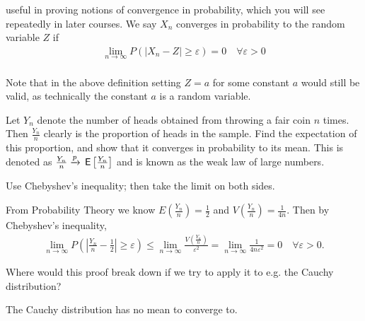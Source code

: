  useful in proving notions of convergence in probability, which you will see repeatedly in later courses.
We say $X_n$ converges in probability to the random variable $Z$ if
\begin{align*}
    \lim_{n\rightarrow\infty}P(\left|X_n-Z\right| \geq \varepsilon) = 0\quad\forall\varepsilon>0
\end{align*}\\
Note that in the above definition setting $Z=a$ for some constant $a$ would still be valid, as technically the constant $a$ is a random variable.

\begin{exercise}
Let $Y_n$ denote the number of heads obtained from throwing a fair coin $n$ times. Then $\frac{Y_n}{n}$ clearly is the proportion of heads in the sample. Find the expectation of this proportion, and show that it converges in probability to its mean. This is denoted as $\frac{Y_n}{n}\xrightarrow{p}\,\mathsf{E}\left[\frac{Y_n}{n}\right]$ and is known as the weak law of large numbers.\\
\begin{hint}
Use Chebyshev's inequality;  then take the limit on both sides.
\end{hint}
\begin{solution}
From Probability Theory we know $E\left(\frac{Y_n}{n}\right)=\frac12$ and $V\left(\frac{Y_n}{n}\right) = \frac{1}{4 n}$. Then by Chebyshev's inequality,
\begin{align*}
    \lim_{n\rightarrow\infty}P\left(\left|\frac{Y_n}{n}-\frac12\right| \geq \varepsilon\right) \leq  \lim_{n\rightarrow\infty}\frac{V\left(\frac{Y_n}{n}\right)}{\varepsilon^2} =  \lim_{n\rightarrow\infty}\frac{1}{4n\varepsilon^2} = 0\quad\forall\varepsilon>0.
\end{align*}
\end{solution}
\end{exercise}

\begin{exercise}
Where would this proof break down if we try to apply it to e.g. the Cauchy distribution?
\begin{solution}
The Cauchy distribution has no mean to converge to.
\end{solution}
\end{exercise}

